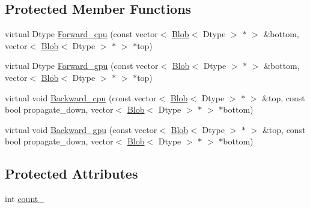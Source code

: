 \subsection*{Protected Member Functions}
\begin{DoxyCompactItemize}
\item 
virtual Dtype \hyperlink{classcaffe_1_1_flatten_layer_a53caee1cc9658db97e9daefbcdffdc12}{Forward\+\_\+cpu} (const vector$<$ \hyperlink{classcaffe_1_1_blob}{Blob}$<$ Dtype $>$ $\ast$ $>$ \&bottom, vector$<$ \hyperlink{classcaffe_1_1_blob}{Blob}$<$ Dtype $>$ $\ast$ $>$ $\ast$top)
\item 
virtual Dtype \hyperlink{classcaffe_1_1_flatten_layer_a30c8f30255ed20ef7351673aacdbe680}{Forward\+\_\+gpu} (const vector$<$ \hyperlink{classcaffe_1_1_blob}{Blob}$<$ Dtype $>$ $\ast$ $>$ \&bottom, vector$<$ \hyperlink{classcaffe_1_1_blob}{Blob}$<$ Dtype $>$ $\ast$ $>$ $\ast$top)
\item 
virtual void \hyperlink{classcaffe_1_1_flatten_layer_a5b7439a850684ebd8901180853809a50}{Backward\+\_\+cpu} (const vector$<$ \hyperlink{classcaffe_1_1_blob}{Blob}$<$ Dtype $>$ $\ast$ $>$ \&top, const bool propagate\+\_\+down, vector$<$ \hyperlink{classcaffe_1_1_blob}{Blob}$<$ Dtype $>$ $\ast$ $>$ $\ast$bottom)
\item 
virtual void \hyperlink{classcaffe_1_1_flatten_layer_ae5f1044beb9b5c4d60ff8fd5487ad338}{Backward\+\_\+gpu} (const vector$<$ \hyperlink{classcaffe_1_1_blob}{Blob}$<$ Dtype $>$ $\ast$ $>$ \&top, const bool propagate\+\_\+down, vector$<$ \hyperlink{classcaffe_1_1_blob}{Blob}$<$ Dtype $>$ $\ast$ $>$ $\ast$bottom)
\end{DoxyCompactItemize}
\subsection*{Protected Attributes}
\begin{DoxyCompactItemize}
\item 
int \hyperlink{classcaffe_1_1_flatten_layer_ac162173144262f64a0450799072d4090}{count\+\_\+}
\end{DoxyCompactItemize}


